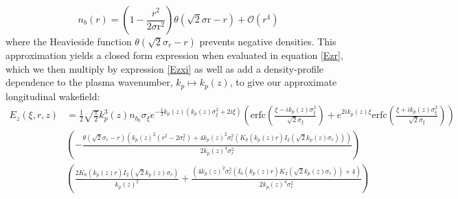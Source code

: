 \begin{equation}
n_b(r)=\left(1-\frac{r^2}{2 \text{$\sigma $r}^2}\right) \theta \left(\sqrt{2} \text{$\sigma $r}-r\right) + \mathcal{O}\left(r^4\right)
\end{equation}
where the Heavieside function $\theta \left(\sqrt{2} \sigma_r-r\right)$ prevents negative densities. This approximation yields a closed form expression when evaluated in equation \ref{Ezr}, which we then multiply by expression \ref{Ezxi} as well as add a density-profile dependence to the plasma wavenumber, $k_p\mapsto k_p(z)$,  to give our approximate longitudinal wakefield:
\begin{equation}
\label{EzApprox}
\begin{split}
E_z\left(\xi,r,z\right)&=\frac{1}{2} \sqrt{\frac{\pi }{2}} k_p^3(z) n_{b_0} \sigma_{\xi}  e^{-\frac{1}{2} k_p(z) \left(k_p(z) \sigma_{\xi} ^2+2 i \xi \right)}
   \left(\text{erfc}\left(\frac{\xi -i k_p(z) \sigma_{\xi} ^2}{\sqrt{2} \sigma_{\xi} }\right)+e^{2 i k_p(z) \xi } \text{erfc}\left(\frac{\xi +i k_p(z) \sigma_{\xi} ^2}{\sqrt{2} \sigma_{\xi} }\right)\right) \\
   & \left(-\frac{\theta \left(\sqrt{2}\sigma_r-r\right) \left(k_p(z)^2 \left(r^2-2 \sigma_r^2\right)+4
   k_p(z)^2 \sigma_r^2 \left(K_0(k_p(z) r) I_2\left(\sqrt{2} k_p(z) \sigma_r\right)\right)\right)}{2 k_p(z)^4 \sigma_r^2}\right)\\
   & \left(\frac{2 K_0(k_p(z) r) I_2\left(\sqrt{2} k_p(z) \sigma_r\right)}{k_p(z)^2}+\frac{ \left(4
   k_p(z)^2 \sigma_r^2 \left( I_0(k_p(z) r) K_2\left(\sqrt{2}
   k_p(z) \sigma_r\right)\right)+4\right)}{2 k_p(z)^4 \sigma_r^2}\right)
   \end{split}
\end{equation}
